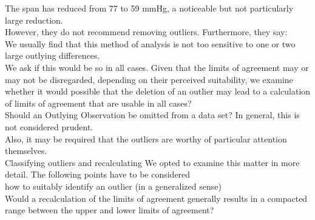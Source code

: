 \documentclass[Main.tex]{subfiles}
\begin{document}
	The span has reduced from 77 to 59 mmHg, a noticeable but not
	particularly large reduction.
	\\
	However, they do not recommend removing outliers. Furthermore,
	they say:
	\\
	We usually find that this method of analysis is not too sensitive
	to one or two large outlying differences.
	\\
	We ask if this would be so in all cases. Given that the limits of
	agreement may or may not be disregarded, depending on their
	perceived suitability, we examine whether it would possible that
	the deletion of an outlier may lead to a calculation of limits of
	agreement that are usable in all cases?
	\\
	Should an Outlying Observation be omitted from a data set? In
	general, this is not considered prudent.
	\\
	Also, it may be required that the outliers are worthy of
	particular attention themselves.
	\\
	Classifying outliers and recalculating We opted to examine this
	matter in more detail. The following points have to be considered
	\\how to suitably identify an outlier (in a generalized sense)
	\\Would a recalculation of the limits of agreement generally
	results in  a compacted range between the upper and lower limits
	of agreement?
		
\end{document}
